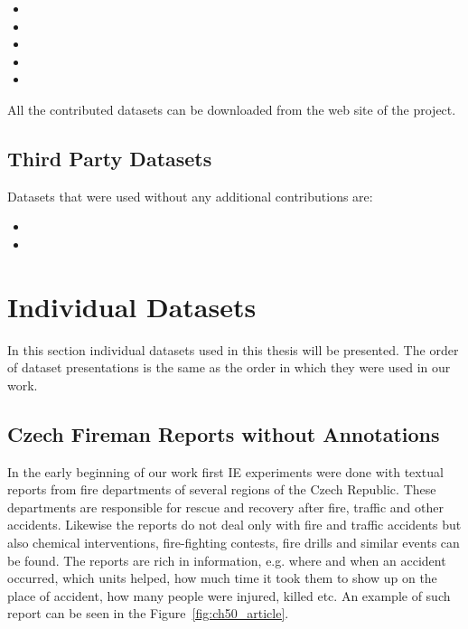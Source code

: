 \begin{itemize}
	\item {}
	\item {}
	\item {}
	\item {}
	\item {}
\end{itemize}

All the contributed datasets can be downloaded from the web site of the project. 
\subsection{Third Party Datasets}

Datasets that were used without any additional contributions are:

\begin{itemize}
	\item {}
	\item {}
\end{itemize}


\section{Individual Datasets}
In this section individual datasets used in this thesis will be presented. The order of dataset presentations is the same as the order in which they were used in our work.

\subsection{Czech Fireman Reports without Annotations} \label{sec:ch40_fireman_without}
In the early beginning of our work first IE experiments were done with textual reports from fire departments of several regions of the Czech Republic. These departments are responsible for rescue and recovery after fire, traffic and other accidents. Likewise the reports do not deal only with fire and traffic accidents but also chemical interventions, fire-fighting contests, fire drills and similar events can be found. The reports are rich in information, e.g. where and when an accident occurred, which units helped, how much time it took them to show up on the place of accident, how many people were injured, killed etc. An example of such report can be seen in the Figure~\ref{fig:ch50_article}.


